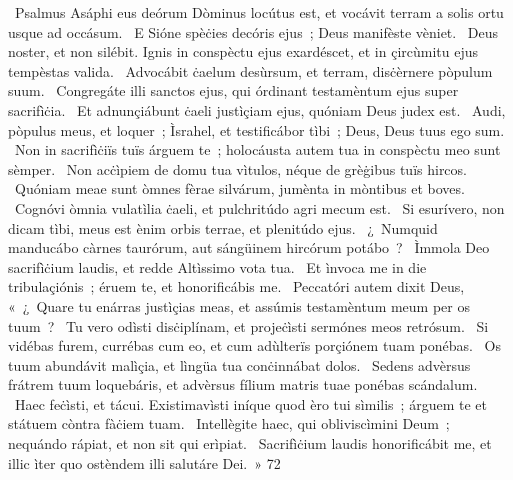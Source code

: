 {~Psalmus Asáphi}
{%
eus deórum Dòminus locútus est, et vocávit terram a solis ortu usque ad occásum.
~E Sióne spèċies decóris ejus~; Deus manifèste vèniet.
~Deus noster, et non silébit. Ignis in conspèctu ejus exardéscet, et in çircùmitu ejus tempèstas valida.
~Advocábit ċaelum desùrsum, et terram, disċèrnere pòpulum suum.
~Congregáte illi sanctos ejus, qui órdinant testamèntum ejus super sacrifìċia.
~Et adnunçiábunt ċaeli justìçiam ejus, quóniam Deus judex est.
~Audi, pòpulus meus, et loquer~; Ìsrahel, et testificábor tìbi~; Deus, Deus tuus ego sum.
~Non in sacrifìċiïs tuïs árguem te~; holocáusta autem tua in conspèctu meo sunt sèmper.
~Non acċìpiem de domu tua vìtulos, néque de grèġibus tuïs hircos.
~Quóniam meae sunt òmnes fèrae silvárum, jumènta in mòntibus et boves.
~Cognóvi òmnia vulatìlia ċaeli, et pulchritúdo agri mecum est.
~Si esurívero, non dicam tìbi, meus est ènim orbis terrae, et plenitúdo ejus.
~¿~Numquid manducábo càrnes taurórum, aut sángüinem hircórum potábo~?
~Ìmmola Deo sacrifìċium laudis, et redde Altìssimo vota tua.
~Et ìnvoca me in die tribulaçiónis~; éruem te, et honorificábis me.
~Peccatóri autem dixit Deus, «~¿~Quare tu enárras justìçias meas, et assúmis testamèntum meum per os tuum~?
~Tu vero odìsti disċiplínam, et projeċìsti sermónes meos retrósum.
~Si vidébas furem, currébas cum eo, et cum adùlterïs porçiónem tuam ponébas.
~Os tuum abundávit malìçia, et lìngüa tua conċinnábat dolos.
~Sedens advèrsus frátrem tuum loquebáris, et advèrsus fílium matris tuae ponébas scándalum.
~Haec feċìsti, et tácui. Existimavìsti iníque quod èro tui sìmilis~; árguem te et státuem còntra fàċiem tuam.
~Intellègite haec, qui obliviscìmini Deum~; nequándo rápiat, et non sit qui erìpiat.
~Sacrifìċium laudis honorificábit me, et illic ìter quo ostèndem illi salutáre Dei.~»}
{7}{2}
